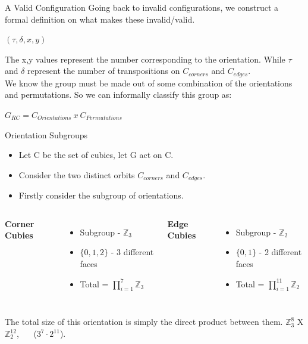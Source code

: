 \documentclass{beamer}
\begin{document}
\begin{frame}[t]{A Valid Configuration}
Going back to invalid configurations, we construct a formal definition on what makes these invalid/valid.\\

\begin{center}
$(\tau,\delta,x,y)$
\end{center}
 The x,y values represent the number corresponding to the orientation. While $\tau$ and $\delta$ represent the number of transpositions on $C_{corners}$ and $C_{edges}$.\\
 
We know the group must be made out of some combination of the orientations and permutations. So we can informally classify this group as:\\
\begin{center}
$G_{RC} = C_{Orientations}\ x\ C_{Permutations}$
\end{center}


\end{frame}

\begin{frame}[t]{Orientation Subgroups}
\begin{itemize}

\item Let C be the set of cubies, let G act on C.
\item Consider the two distinct orbits $C_{corners}$ and $C_{edges}$.
\item Firstly consider the subgroup of orientations.
\end{itemize}
\vspace{1em}

\begin{columns}
\textbf{Corner Cubies}
\begin{itemize}
\item Subgroup - $\mathbb{Z}_3$
\item $\{0,1,2\}$ - 3 different faces
\item Total = $\prod_{i=1}^{7}\mathbb{Z}_3$
\end{itemize}

 
\textbf{Edge Cubies}
\begin{itemize}
\item Subgroup - $\mathbb{Z}_{2}$
\item $\{0,1\}$ - 2 different faces
\item Total = $\prod_{i=1}^{11} \mathbb{Z}_2$
\end{itemize}
\end{columns}
\begin{center}

The total size of this orientation is simply the direct product between them.
$ \mathbb{Z}_3^8$ X $\mathbb{Z}_2^{12}$, $\ \ \ \ \ $         ($3^7 \cdot 2^{11}$).\\

\end{center}
\end{frame}
\end{document}
